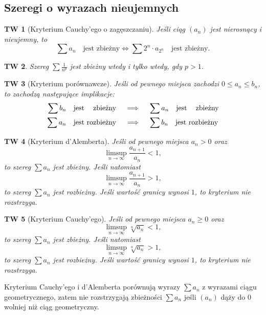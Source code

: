 \documentclass[a4paper, 12pt]{mwart}
\theoremstyle{definition}
\theoremstyle{plain}
\newtheorem{twierdzenie}{TW}[section]
\theoremstyle{remark}
\begin{document}
\subsection{Szeregi o wyrazach nieujemnych}
\begin{twierdzenie}[Kryterium Cauchy'ego o zagęszczaniu]
	Jeśli ciąg $(a_n)$ jest \emph{nierosnący i nieujemny}, to
	\begin{equation}
		\sum a_n \quad\text{jest zbieżny} \iff \sum 2^n\cdot a_{2^n} \quad\text{jest zbieżny.}
	\end{equation}
\end{twierdzenie}
\begin{twierdzenie}
	Szereg $\sum \frac{1}{n^p}$ jest zbieżny wtedy i tylko wtedy, gdy $p > 1$.
\end{twierdzenie}
\begin{twierdzenie}[Kryterium porównawcze]
	Jeśli od pewnego miejsca zachodzi $0\leq a_n\leq b_n$, to zachodzą następujące implikacje:
	\begin{equation}
		\begin{aligned}
			\sum b_n \quad\text{jest \phantom{ro}zbieżny}\quad&\implies\quad\sum a_n \quad\text{jest \phantom{ro}zbieżny} \\
			\sum a_n \quad\text{jest rozbieżny}\quad&\implies\quad\sum b_n \quad\text{jest rozbieżny} \\
		\end{aligned}
	\end{equation}
\end{twierdzenie}
\begin{twierdzenie}[Kryterium d'Alemberta]
	Jeśli od pewnego miejsca $a_n > 0$ oraz
	\begin{equation}
		\limsup_{n\to\infty} \frac{a_{n+1}}{a_n} < 1,
	\end{equation}
	to szereg $\sum a_n$ jest zbieżny. Jeśli natomiast
	\begin{equation}
		\limsup_{n\to\infty} \frac{a_{n+1}}{a_n} > 1,
	\end{equation}
	to szereg $\sum a_n$ jest rozbieżny. Jeśli wartość granicy wynosi $1$, to kryterium nie rozstrzyga.
\end{twierdzenie}
\begin{twierdzenie}[Kryterium Cauchy'ego]
	Jeśli od pewnego miejsca $a_n \geq 0$ oraz
	\begin{equation}
		\limsup_{n\to\infty} \sqrt[n]{a_n} < 1,
	\end{equation}
	to szereg $\sum a_n$ jest zbieżny. Jeśli natomiast
	\begin{equation}
		\limsup_{n\to\infty} \sqrt[n]{a_n} > 1,
	\end{equation}
	to szereg $\sum a_n$ jest rozbieżny. Jeśli wartość granicy wynosi $1$, to kryterium nie rozstrzyga.
\end{twierdzenie}
Kryterium Cauchy'ego i d'Alemberta porównują wyrazy $\sum a_n$ z wyrazami ciągu geometrycznego, zatem nie rozstrzygają zbieżności $\sum a_n$ jeśli $(a_n)$ dąży do $0$ wolniej niż ciąg geometryczny.
\end{document}
